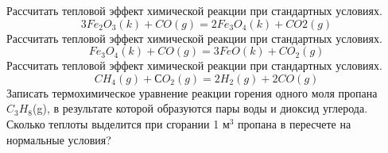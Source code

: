 \Qvery 
Рассчитать тепловой эффект химической реакции при стандартных условиях. $$3Fe_{2}O_{3} (k)+CO (g)=2Fe_{3}O_{4} (k)+CO2 (g)$$
\endQvery
\Qvery 
Рассчитать тепловой эффект химической реакции при стандартных условиях. $$Fe_{3}O_{4} (k)+CO (g)=3FeO (k)+CO_{2} (g)$$
\endQvery
\Qvery 
Рассчитать тепловой эффект химической реакции при стандартных условиях. $$CH_{4}(g) + СO_{2}(g) = 2H_{2} (g)+2CO(g)$$
\endQvery
\Qvery 
Записать термохимическое уравнение реакции горения одного моля пропана $C_{3}H_{8}$(g), в результате которой образуются пары воды и диоксид углерода. Сколько теплоты выделится при сгорании 1 м$^{3}$ пропана в пересчете на нормальные условия?
\endQvery
